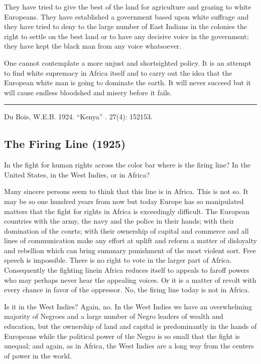 \documentclass[letterpaper,10pt,english]{jupyterBook}
\begin{document}
\sphinxAtStartPar
They have tried to give the best of the land for agriculture and grazing to white Europeans. They have established a government based upon white suffrage and they have tried to deny to the large number of East Indians in the colonies the right to settle on the best land or to have any decisive voice in the government; they have kept the black man from any voice whatsoever.

\sphinxAtStartPar
One cannot contemplate a more unjust and shortsighted policy. It is an attempt to find white supremacy in Africa itself and to carry out the idea that the European white man is going to dominate the earth. It will never succeed but it will cause endless bloodshed and misery before it fails.


\bigskip\hrule\bigskip


\sphinxAtStartPar
{} Du Bois, W.E.B. 1924. “Kenya” . 27(4): 152\sphinxhyphen{}153.


\subsection{The Firing Line (1925)}
\label{\detokenize{Volumes/31/02/firing_line:the-firing-line-1925}}\label{\detokenize{Volumes/31/02/firing_line::doc}}
\sphinxAtStartPar
In the fight for human rights across the color bar where is the firing line? In the United States, in the West Indies, or in Africa?

\sphinxAtStartPar
Many sincere persons seem to think that this line is in Africa. This is not so. It may be so one hundred years from now but today Europe has so manipulated matters that the fight for rights in Africa is exceedingly difficult. The European countries with the army, the navy and the police in their hands; with their domination of the courts; with their ownership of capital and commerce and all lines of communication make any effort at uplift and reform a matter of disloyalty and rebellion which can bring summary punishment of the most violent sort. Free speech is impossible. There is no right to vote in the larger part of Africa. Consequently the fighting line\sphinxhyphen{}in Africa reduces itself to appeals to far\sphinxhyphen{}off powers who may perhaps never hear the appealing voices. Or it is a matter of revolt with every chance in favor of the oppressor. No, the firing line today is not in Africa.

\sphinxAtStartPar
Is it in the West Indies? Again, no. In the West Indies we have an overwhelming majority of Negroes and a large number of Negro leaders of wealth and education, but the ownership of land and capital is predominantly in the hands of Europeans while the political power of the Negro is so small that the fight is unequal; and again, as in Africa, the West Indies are a long way from the centers of power in the world.
\end{document}
